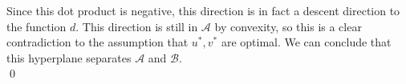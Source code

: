 \documentclass[a4paper]{article}
\begin{document}
Since this dot product is negative, this direction is in fact a descent direction to the function $d$. This direction is still in $\mathcal{A}$ by convexity, so this is a clear contradiction to the assumption that $u^*, v^*$ are optimal. We can conclude that this hyperplane separates $\mathcal{A}$ and $\mathcal{B}$. \\ \qed \\
\end{document}
